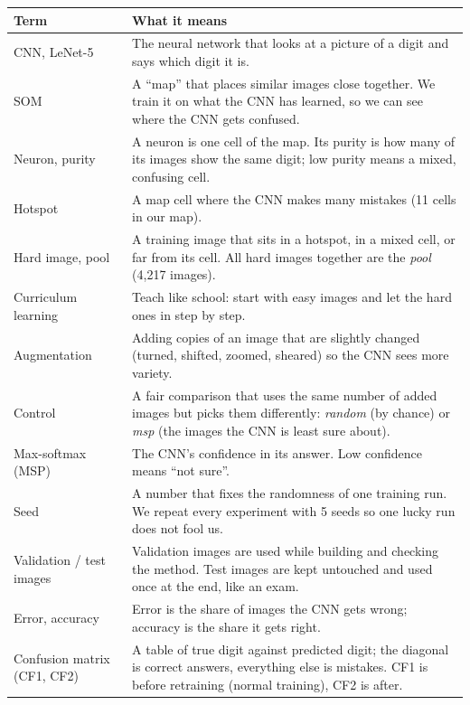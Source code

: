 \documentclass[11pt]{article}
\begin{document}
\renewcommand{\arraystretch}{1.12}
{\small
\begin{tabularx}{\textwidth}{|>{\raggedright\arraybackslash}p{}|X|}
\hline
\textbf{Term} & \textbf{What it means} \\ \hline
CNN, LeNet-5 & The neural network that looks at a picture of a digit and says which digit it is. \\ \hline
SOM & A ``map'' that places similar images close together. We train it on what the CNN has learned, so we can see where the CNN gets confused. \\ \hline
Neuron, purity & A neuron is one cell of the map. Its purity is how many of its images show the same digit; low purity means a mixed, confusing cell. \\ \hline
Hotspot & A map cell where the CNN makes many mistakes (11 cells in our map). \\ \hline
Hard image, pool & A training image that sits in a hotspot, in a mixed cell, or far from its cell. All hard images together are the \emph{pool} (4{,}217 images). \\ \hline
Curriculum learning & Teach like school: start with easy images and let the hard ones in step by step. \\ \hline
Augmentation & Adding copies of an image that are slightly changed (turned, shifted, zoomed, sheared) so the CNN sees more variety. \\ \hline
Control & A fair comparison that uses the same number of added images but picks them differently: \emph{random} (by chance) or \emph{msp} (the images the CNN is least sure about). \\ \hline
Max-softmax (MSP) & The CNN's confidence in its answer. Low confidence means ``not sure''. \\ \hline
Seed & A number that fixes the randomness of one training run. We repeat every experiment with 5 seeds so one lucky run does not fool us. \\ \hline
Validation / test images & Validation images are used while building and checking the method. Test images are kept untouched and used once at the end, like an exam. \\ \hline
Error, accuracy & Error is the share of images the CNN gets wrong; accuracy is the share it gets right. \\ \hline
Confusion matrix (CF1, CF2) & A table of true digit against predicted digit; the diagonal is correct answers, everything else is mistakes. CF1 is before retraining (normal training), CF2 is after. \\ \hline

\end{tabularx}}
\end{document}
